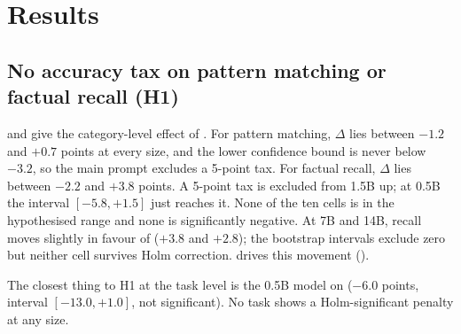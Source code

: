 \section{Results}
\label{sec:results}

\subsection{No accuracy tax on pattern matching or factual recall (H1)}
\label{sec:h1}

 and  give the category-level effect of \CoT.
For pattern matching, $\Delta$ lies between $-1.2$ and $+0.7$ points at every size, and the lower confidence bound is never below $-3.2$, so the main prompt excludes a 5-point tax.
For factual recall, $\Delta$ lies between $-2.2$ and $+3.8$ points.
A 5-point tax is excluded from 1.5B up; at 0.5B the interval $[-5.8, +1.5]$ just reaches it.
None of the ten cells is in the hypothesised range and none is significantly negative.
At 7B and 14B, recall moves slightly in favour of \CoT ($+3.8$ and $+2.8$); the bootstrap intervals exclude zero but neither cell survives Holm correction.
\triviaqa drives this movement ().

The closest thing to H1 at the task level is the 0.5B model on \mmlu ($-6.0$ points, interval $[-13.0, +1.0]$, not significant).
No task shows a Holm-significant \CoT penalty at any size.

